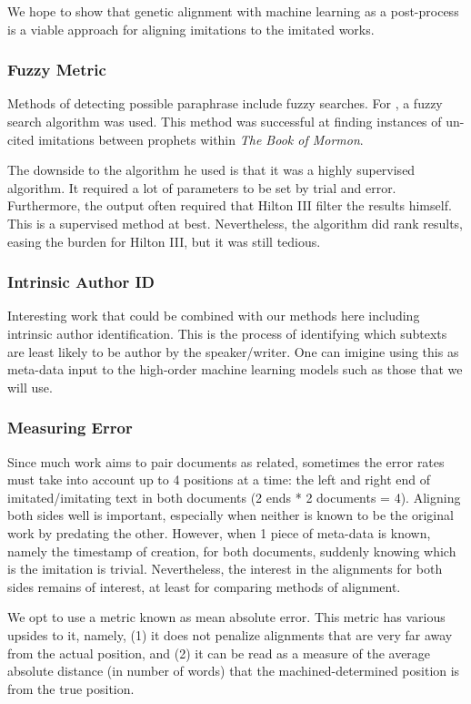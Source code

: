 We hope to show that genetic alignment with machine learning as a post-process is a viable approach for aligning imitations to the imitated works.


\subsubsection{Fuzzy Metric}
Methods of detecting possible paraphrase include fuzzy searches. For \cite{hilton_2012}, a fuzzy search algorithm was used. This method was successful at finding instances of un-cited imitations between prophets within \textit{The Book of Mormon}.

The downside to the algorithm he used is that it was a highly supervised algorithm. It required a lot of parameters to be set by trial and error. Furthermore, the output often required that Hilton III filter the results himself. This is a supervised method at best. Nevertheless, the algorithm did rank results, easing the burden for Hilton III, but it was still tedious.


\subsubsection{Intrinsic Author ID}
Interesting work that could be combined with our methods here including intrinsic author identification. This is the process of identifying which subtexts are least likely to be author by the speaker/writer. One can imigine using this as meta-data input to the high-order machine learning models such as those that we will use.

\subsubsection{Measuring Error}
Since much work aims to pair documents as related, sometimes the error rates must take into account up to 4 positions at a time: the left and right end of imitated/imitating text in both documents (2 ends * 2 documents = 4). %
Aligning both sides well is important, especially when neither is known to be the original work by predating the other. However, when 1 piece of meta-data is known, namely the timestamp of creation, for both documents, suddenly knowing which is the imitation is trivial. Nevertheless, the interest in the alignments for both sides remains of interest, at least for comparing methods of alignment.

We opt to use a metric known as mean absolute error. This metric has various upsides to it, namely, (1) it does not penalize alignments that are very far away from the actual position, and (2) it can be read as a measure of the average absolute distance (in number of words) that the machined-determined position is from the true position.